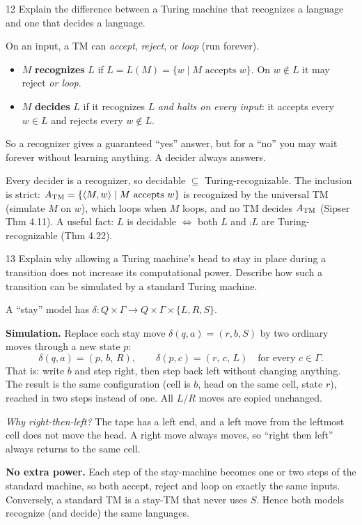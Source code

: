 \begin{question}{12}
Explain the difference between a Turing machine that recognizes a language and one that decides a language.
\end{question}
\begin{soln}
On an input, a TM can \emph{accept}, \emph{reject}, or \emph{loop} (run forever).
\begin{itemize}
\item $M$ \textbf{recognizes} $L$ if $L=L(M)=\{w\mid M\text{ accepts }w\}$. On $w\notin L$ it may reject \emph{or loop}.
\item $M$ \textbf{decides} $L$ if it recognizes $L$ \emph{and halts on every input}: it accepts every $w\in L$ and rejects every $w\notin L$.
\end{itemize}
So a recognizer gives a guaranteed ``yes'' answer, but for a ``no'' you may wait forever without learning anything. A decider always answers.

Every decider is a recognizer, so decidable $\subseteq$ Turing-recognizable. The inclusion is strict: $A_{\mathrm{TM}}=\{\langle M,w\rangle\mid M \text{ accepts } w\}$ is recognized by the universal TM (simulate $M$ on $w$), which loops when $M$ loops, and no TM decides $A_{\mathrm{TM}}$ (Sipser Thm 4.11).
A useful fact: $L$ is decidable $\iff$ both $L$ and $\comp L$ are Turing-recognizable (Thm 4.22).
\end{soln}

\begin{question}{13}
Explain why allowing a Turing machine's head to stay in place during a transition does not increase its computational power. Describe how such a transition can be simulated by a standard Turing machine.
\end{question}
\begin{soln}
A ``stay'' model has $\delta:Q\times\Gamma\to Q\times\Gamma\times\{L,R,S\}$.

\textbf{Simulation.} Replace each stay move $\delta(q,a)=(r,b,S)$ by two ordinary moves through a new state $p$:
\[
\delta(q,a)=(p,\,b,\,R),\qquad \delta(p,c)=(r,\,c,\,L)\quad\text{for every }c\in\Gamma .
\]
That is: write $b$ and step right, then step back left without changing anything. The result is the same configuration (cell is $b$, head on the same cell, state $r$), reached in two steps instead of one. All $L/R$ moves are copied unchanged.

\emph{Why right-then-left?} The tape has a left end, and a left move from the leftmost cell does not move the head. A right move always moves, so ``right then left'' always returns to the same cell.

\textbf{No extra power.} Each step of the stay-machine becomes one or two steps of the standard machine, so both accept, reject and loop on exactly the same inputs. Conversely, a standard TM is a stay-TM that never uses $S$. Hence both models recognize (and decide) the same languages.
\end{soln}

